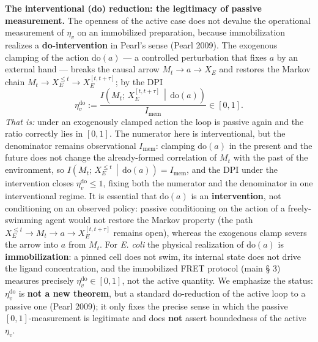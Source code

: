 \documentclass[pdflatex,sn-mathphys-ay]{sn-jnl}
\begin{document}
\textbf{The interventional (do) reduction: the legitimacy of passive measurement.} The openness of the active case does not devalue the operational measurement of \(\eta_v\) on an immobilized preparation, because immobilization realizes a \textbf{do-intervention} in Pearl's sense (Pearl 2009). The exogenous clamping of the action \(\mathrm{do}(a)\) --- a controlled perturbation that fixes \(a\) by an external hand --- breaks the causal arrow \(M_t \to a \to X_E\) and restores the Markov chain \(M_t \to X_E^{\le t} \to X_E^{[t, t+\tau]}\); by the DPI \[\eta_v^{\mathrm{do}} := \frac{I\!\left(M_t;\, X_E^{[t, t+\tau]} \,\middle|\, \mathrm{do}(a)\right)}{I_{\text{mem}}} \in [0, 1].\] \emph{That is:} under an exogenously clamped action the loop is passive again and the ratio correctly lies in \([0, 1]\). The numerator here is interventional, but the denominator remains observational \(I_{\text{mem}}\): clamping \(\mathrm{do}(a)\) in the present and the future does not change the already-formed correlation of \(M_t\) with the past of the environment, so \(I\!\left(M_t;\, X_E^{\le t}\,\middle|\,\mathrm{do}(a)\right) = I_{\text{mem}}\), and the DPI under the intervention closes \(\eta_v^{\mathrm{do}} \le 1\), fixing both the numerator and the denominator in one interventional regime. It is essential that \(\mathrm{do}(a)\) is an \textbf{intervention}, not conditioning on an observed policy: passive conditioning on the action of a freely-swimming agent would not restore the Markov property (the path \(X_E^{\le t} \to M_t \to a \to X_E^{[t, t+\tau]}\) remains open), whereas the exogenous clamp severs the arrow into \(a\) from \(M_t\). For \emph{E. coli} the physical realization of \(\mathrm{do}(a)\) is \textbf{immobilization}: a pinned cell does not swim, its internal state does not drive the ligand concentration, and the immobilized FRET protocol (main § 3) measures precisely \(\eta_v^{\mathrm{do}} \in [0, 1]\), not the active quantity. We emphasize the status: \(\eta_v^{\mathrm{do}}\) is \textbf{not a new theorem}, but a standard do-reduction of the active loop to a passive one (Pearl 2009); it only fixes the precise sense in which the passive \([0, 1]\)-measurement is legitimate and does \textbf{not} assert boundedness of the active \(\eta_v\).
\end{document}
